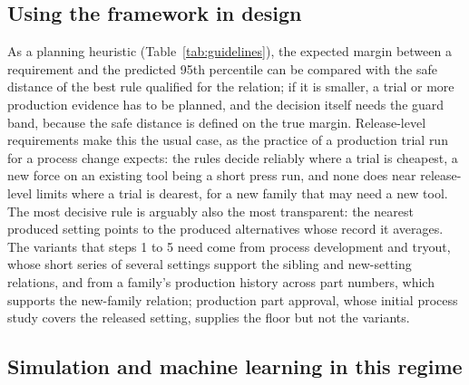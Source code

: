 \documentclass[pdflatex,sn-basic,lineno]{sn-jnl}
\begin{document}
\subsection{Using the framework in design}

As a planning heuristic (Table~\ref{tab:guidelines}), the expected margin between a requirement and the predicted 95th percentile can be compared with the safe distance of the best rule qualified for the relation; if it is smaller, a trial or more production evidence has to be planned, and the decision itself needs the guard band, because the safe distance is defined on the true margin. Release-level requirements make this the usual case, as the practice of a production trial run for a process change expects: the rules decide reliably where a trial is cheapest, a new force on an existing tool being a short press run, and none does near release-level limits where a trial is dearest, for a new family that may need a new tool. The most decisive rule is arguably also the most transparent: the nearest produced setting points to the produced alternatives whose record it averages. The variants that steps 1 to 5 need come from process development and tryout, whose short series of several settings support the sibling and new-setting relations, and from a family's production history across part numbers, which supports the new-family relation; production part approval, whose initial process study covers the released setting, supplies the floor but not the variants.

\subsection{Simulation and machine learning in this regime}
\end{document}
